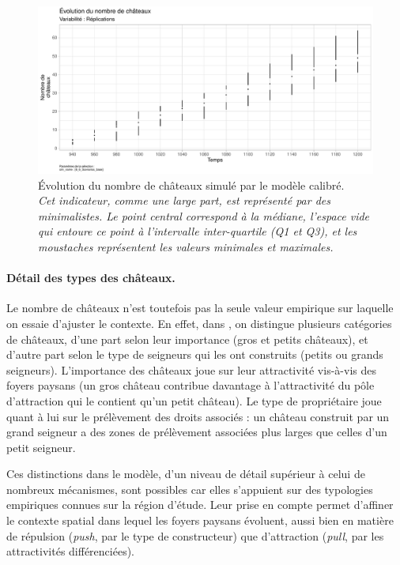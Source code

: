 \begin{figure}[H]
	\centering
	\includegraphics[width=\linewidth]{img/results_6_6/Chateaux_Nb_Haut.pdf}
	\caption[Évolution du nombre de châteaux simulé par le modèle calibré.]{Évolution du nombre de châteaux simulé par le modèle calibré.\\
	\textit{Cet indicateur, comme une large part, est représenté par des  minimalistes\fg{}. Le point central correspond à la médiane, l'espace vide qui entoure ce point à l'intervalle inter-quartile (Q1 et Q3), et les \og moustaches\fg{} représentent les valeurs minimales et maximales.
	}}
	\label{fig:calibrage-chateaux-nb}
\end{figure}

\paragraph{Détail des types des châteaux.}
Le nombre de châteaux n'est toutefois pas la seule valeur empirique sur laquelle on essaie d'ajuster le contexte.
En effet, dans \simfeodal{}, on distingue plusieurs catégories de châteaux, d'une part selon leur importance (gros et petits châteaux), et d'autre part selon le type de seigneurs qui les ont construits (petits ou grands seigneurs).
L'importance des châteaux joue sur leur attractivité vis-à-vis des foyers paysans (un gros château contribue davantage à l'attractivité du pôle d'attraction qui le contient qu'un petit château).
Le type de propriétaire joue quant à lui sur le prélèvement des droits associés : un château construit par un grand seigneur a des zones de prélèvement associées plus larges que celles d'un petit seigneur.

Ces distinctions dans le modèle, d'un niveau de détail supérieur à celui de nombreux mécanismes, sont possibles car elles s'appuient sur des typologies empiriques connues sur la région d'étude.
Leur prise en compte permet d'affiner le contexte spatial dans lequel les foyers paysans évoluent, aussi bien en matière de répulsion (\textit{push}, par le type de constructeur) que d'attraction (\textit{pull}, par les attractivités différenciées).


